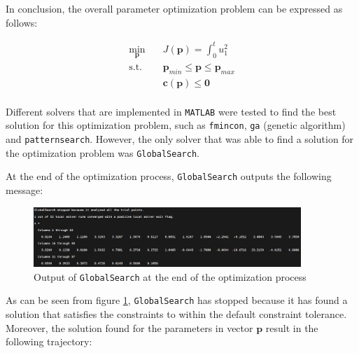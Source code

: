 \documentclass{thesisreport}
\begin{document}
In conclusion, the overall parameter optimization problem can be expressed as follows: 

\begin{equation}\label{parameter_optimization_problem}
\begin{aligned}
            \min_{\bm{p}} \quad & J(\bm{p}) = \int_0^t u_1^2 \\
            \textrm{s.t.} \quad & \bm{p}_{min} \leq \bm{p} \leq \bm{p}_{max} \\
            & \bm{c}(\bm{p}) \leq \bm{0} \\
        \end{aligned}
\end{equation}

Different solvers that are implemented in \texttt{MATLAB} were tested to find the best solution for this optimization problem, such as \texttt{fmincon}, \texttt{ga} (genetic algorithm) and \texttt{patternsearch}. However, the only solver that was able to find a solution for the optimization problem was \texttt{GlobalSearch}.

\newpage

At the end of the optimization process, \texttt{GlobalSearch} outputs the following message:

\begin{figure}[h]
	\centering
	\includegraphics[width=0.9\textwidth]{Images/optimization/solution.png}
	\caption{Output of \texttt{GlobalSearch} at the end of the optimization process}
	\label{fmincon_output}
\end{figure}

As can be seen from figure \ref{fmincon_output}, \texttt{GlobalSearch} has stopped because it has found a solution that satisfies the constraints to within the default constraint tolerance. Moreover, the solution found for the parameters in vector $\bm{p}$ result in the following trajectory:
\end{document}
